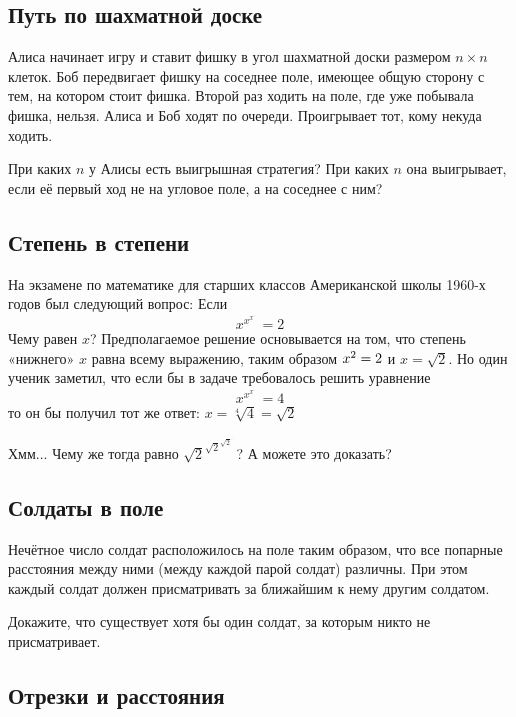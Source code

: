 \subsection*{Путь по шахматной доске} %

Алиса начинает игру и ставит фишку в угол шахматной доски размером $n{\times}n$ клеток.
Боб передвигает фишку на соседнее поле, имеющее общую сторону с тем, на котором стоит фишка.
Второй раз ходить на поле, где уже побывала фишка, нельзя. 
Алиса и Боб ходят по очереди.
Проигрывает тот, кому некуда ходить.

При каких $n$ у Алисы есть выигрышная стратегия? 
При каких $n$ она выигрывает, если её первый ход не на угловое поле, а на соседнее с ним?

\subsection*{Степень в степени} %

На экзамене по математике для старших классов Американской школы 1960-х годов 
был следующий вопрос:
Если 
$$x^{x^{x^{{\cdot}^{\cdot^{\cdot}}}}}=2$$
Чему равен $x$? 
Предполагаемое решение основывается на том, что степень «нижнего» $x$ равна всему выражению, таким образом $x^2\z=2$ и $x=\sqrt{2}$.
Но один ученик заметил, что если бы в задаче требовалось решить уравнение
$$x^{x^{x^{{\cdot}^{\cdot^{\cdot}}}}}=4$$
то он бы получил тот же ответ: $x=\sqrt[4]{4}=\sqrt{2}$

Хмм...
Чему же тогда равно ${\sqrt{2}}^{{\sqrt{2}}^{{\sqrt{2}}^{{\cdot}^{\cdot^{\cdot}}}}}$? 
А можете это доказать?

\subsection*{Солдаты в поле} %

Нечётное число солдат расположилось на поле таким образом, что все попарные расстояния между ними (между каждой парой солдат) различны.
При этом каждый солдат должен присматривать за ближайшим к нему другим солдатом.

Докажите, что существует хотя бы один солдат, за которым никто не присматривает.

\subsection*{Отрезки и расстояния} %

